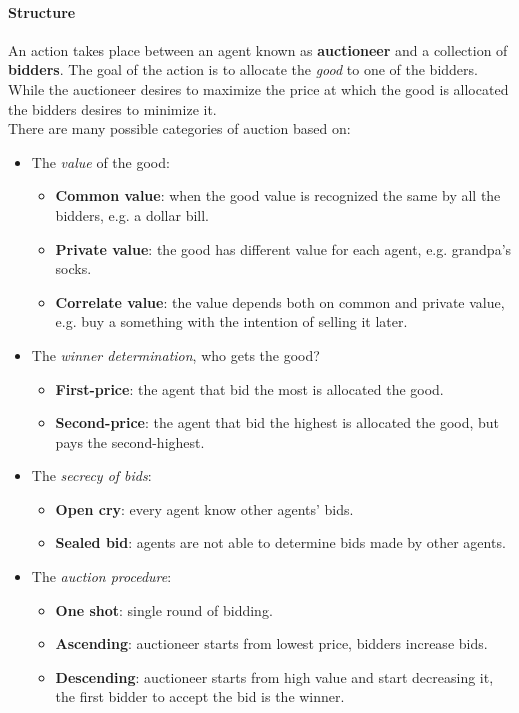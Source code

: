 \documentclass[10pt,a4paper]{article}
\begin{document}
\paragraph{Structure}
An action takes place between an agent known as \textbf{auctioneer} and a collection of \textbf{bidders}. The goal of the action is to allocate the \textit{good} to one of the bidders. While the auctioneer desires to maximize the price at which the good is allocated the bidders desires to minimize it.\\
There are many possible categories of auction based on:
\begin{itemize}
\item The \textit{value} of the good:

	\begin{itemize}
	\item \textbf{Common value}: when the good value is recognized the same by all the bidders, e.g. a dollar bill.
	\item \textbf{Private value}: the good has different value for each agent, e.g. grandpa's socks. 
	\item \textbf{Correlate value}: the value depends both on common and private value, e.g. buy a something with the intention of selling it later.
	\end{itemize}

\item The \textit{winner determination}, who gets the good?

	\begin{itemize}
	\item \textbf{First-price}: the agent that bid the most is allocated the good.
	\item \textbf{Second-price}: the agent that bid the highest is allocated the good, but pays the second-highest.
	\end{itemize}	 

\item The \textit{secrecy of bids}:

	\begin{itemize}
	\item \textbf{Open cry}: every agent know other agents' bids.
	\item \textbf{Sealed bid}: agents are not able to determine bids made by other agents.
	\end{itemize}
	
\item The \textit{auction procedure}:

	\begin{itemize}
	\item \textbf{One shot}: single round of bidding.
	\item \textbf{Ascending}: auctioneer starts from lowest price, bidders increase bids.
	\item \textbf{Descending}: auctioneer starts from high value and start decreasing it, the first bidder to accept the bid is the winner.
	\end{itemize}
	

\end{itemize}
\end{document}
